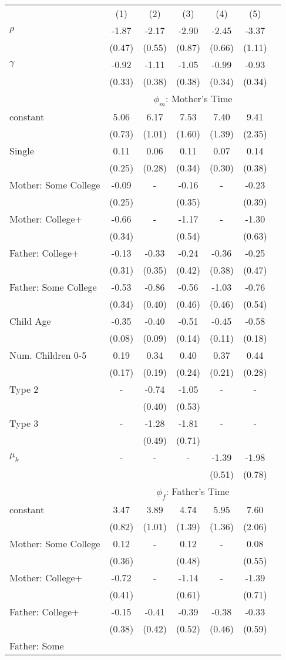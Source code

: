 \begin{tabular}{lcccccc}\\\toprule
&(1)&(2)&(3)&(4)&(5)&\\\cmidrule(r){2-7}$\rho$&-1.87&-2.17&-2.90&-2.45&-3.37&\\
&(0.47)&(0.55)&(0.87)&(0.66)&(1.11)&\\
$\gamma$&-0.92&-1.11&-1.05&-0.99&-0.93&\\
&(0.33)&(0.38)&(0.38)&(0.34)&(0.34)&\\
& \multicolumn{6}{c}{$\phi_{m}$: Mother's Time}\\\cmidrule(r){2-7}constant&5.06&6.17&7.53&7.40&9.41&\\&(0.73)&(1.01)&(1.60)&(1.39)&(2.35)&\\Single&0.11&0.06&0.11&0.07&0.14&\\&(0.25)&(0.28)&(0.34)&(0.30)&(0.38)&\\Mother: Some College&-0.09&-&-0.16&-&-0.23&\\&(0.25)&&(0.35)&&(0.39)&\\Mother: College+&-0.66&-&-1.17&-&-1.30&\\&(0.34)&&(0.54)&&(0.63)&\\Father: College+&-0.13&-0.33&-0.24&-0.36&-0.25&\\&(0.31)&(0.35)&(0.42)&(0.38)&(0.47)&\\Father: Some College&-0.53&-0.86&-0.56&-1.03&-0.76&\\&(0.34)&(0.40)&(0.46)&(0.46)&(0.54)&\\Child Age&-0.35&-0.40&-0.51&-0.45&-0.58&\\&(0.08)&(0.09)&(0.14)&(0.11)&(0.18)&\\Num. Children 0-5&0.19&0.34&0.40&0.37&0.44&\\&(0.17)&(0.19)&(0.24)&(0.21)&(0.28)&\\Type 2&-&-0.74&-1.05&-&-&\\&&(0.40)&(0.53)&&&\\Type 3&-&-1.28&-1.81&-&-&\\&&(0.49)&(0.71)&&&\\$\mu_{k}$&-&-&-&-1.39&-1.98&\\&&&&(0.51)&(0.78)&\\& \multicolumn{6}{c}{$\phi_{f}$: Father's Time}\\\cmidrule(r){2-7}constant&3.47&3.89&4.74&5.95&7.60&\\&(0.82)&(1.01)&(1.39)&(1.36)&(2.06)&\\Mother: Some College&0.12&-&0.12&-&0.08&\\&(0.36)&&(0.48)&&(0.55)&\\Mother: College+&-0.72&-&-1.14&-&-1.39&\\&(0.41)&&(0.61)&&(0.71)&\\Father: College+&-0.15&-0.41&-0.39&-0.38&-0.33&\\&(0.38)&(0.42)&(0.52)&(0.46)&(0.59)&\\Father: Some 
\end{tabular}
